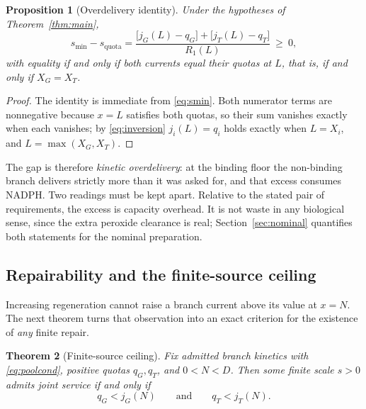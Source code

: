 \documentclass[11pt,a4paper]{article}
\theoremstyle{plain}
\newtheorem{theorem}{Theorem}[section]
\newtheorem{proposition}[theorem]{Proposition}
\theoremstyle{definition}
\theoremstyle{remark}
\begin{document}
\begin{proposition}[Overdelivery identity]\label{prop:overdelivery}
Under the hypotheses of Theorem~\ref{thm:main},
\begin{equation}\label{eq:gap}
  s_{\min}-s_{\mathrm{quota}}
  =\frac{\bigl[j_G(L)-q_G\bigr]+\bigl[j_T(L)-q_T\bigr]}{R_1(L)}\ \ge\ 0,
\end{equation}
with equality if and only if both currents equal their quotas at $L$, that is,
if and only if $X_G=X_T$.
\end{proposition}

\begin{proof}
The identity is immediate from \eqref{eq:smin}. Both numerator terms are
nonnegative because $x=L$ satisfies both quotas, so their sum vanishes exactly
when each vanishes; by \eqref{eq:inversion} $j_i(L)=q_i$ holds exactly when
$L=X_i$, and $L=\max(X_G,X_T)$.
\end{proof}

The gap is therefore \emph{kinetic overdelivery}: at the binding floor the
non-binding branch delivers strictly more than it was asked for, and that excess
consumes NADPH. Two readings must be kept apart. Relative to the stated pair of
requirements, the excess is capacity overhead. It is not waste in any biological
sense, since the extra peroxide clearance is real; Section~\ref{sec:nominal}
quantifies both statements for the nominal preparation.

\subsection{Repairability and the finite-source ceiling}

Increasing regeneration cannot raise a branch current above its value at $x=N$.
The next theorem turns that observation into an exact criterion for the existence
of \emph{any} finite repair.

\begin{theorem}[Finite-source ceiling]\label{thm:ceiling}
Fix admitted branch kinetics with \eqref{eq:poolcond}, positive quotas
$q_G,q_T$, and $0<N<D$. Then some finite scale $s>0$ admits joint service if and
only if
\begin{equation}\label{eq:ceiling}
  q_G<j_G(N)\qquad\text{and}\qquad q_T<j_T(N) .
\end{equation}
\end{theorem}
\end{document}
